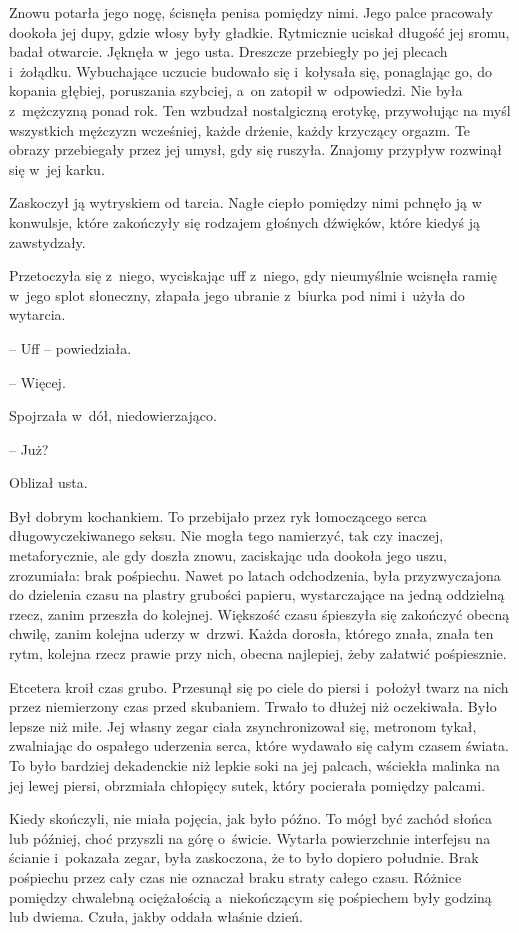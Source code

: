 \documentclass[oneside,polish,11pt,sfheadings]{mwbk}
\begin{document}
Znowu potarła jego nogę, ścisnęła penisa pomiędzy nimi. Jego palce
pracowały dookoła jej dupy, gdzie włosy były gładkie. Rytmicznie uciskał
długość jej sromu, badał otwarcie. Jęknęła w~jego usta. Dreszcze
przebiegły po jej plecach i~żołądku. Wybuchające uczucie budowało się i~kołysała się, ponaglając go, do kopania głębiej, poruszania szybciej, a~on zatopił w~odpowiedzi. Nie była z~mężczyzną ponad rok. Ten wzbudzał
nostalgiczną erotykę, przywołując na myśl wszystkich mężczyzn wcześniej,
każde drżenie, każdy krzyczący orgazm. Te obrazy przebiegały przez jej
umysł, gdy się ruszyła. Znajomy przypływ rozwinął się w~jej karku.

Zaskoczył ją wytryskiem od tarcia. Nagłe ciepło pomiędzy nimi pchnęło ją
w konwulsje, które zakończyły się rodzajem głośnych dźwięków, które
kiedyś ją zawstydzały.

Przetoczyła się z~niego, wyciskając uff z~niego, gdy nieumyślnie
wcisnęła ramię w~jego splot słoneczny, złapała jego ubranie z~biurka pod
nimi i~użyła do wytarcia.

-- Uff -- powiedziała.

-- Więcej.

Spojrzała w~dół, niedowierzająco. 

-- Już?

Oblizał usta.

Był dobrym kochankiem. To przebijało przez ryk łomoczącego serca
długowyczekiwanego seksu. Nie mogła tego namierzyć, tak czy inaczej,
metaforycznie, ale gdy doszła znowu, zaciskając uda dookoła jego uszu,
zrozumiała: brak pośpiechu. Nawet po latach odchodzenia, była
przyzwyczajona do dzielenia czasu na plastry grubości papieru,
wystarczające na jedną oddzielną rzecz, zanim przeszła do kolejnej.
Większość czasu śpieszyła się zakończyć obecną chwilę, zanim kolejna
uderzy w~drzwi. Każda dorosła, którego znała, znała ten rytm, kolejna
rzecz prawie przy nich, obecna najlepiej, żeby załatwić pośpiesznie.

Etcetera kroił czas grubo. Przesunął się po ciele do piersi i~położył
twarz na nich przez niemierzony czas przed skubaniem. Trwało to dłużej
niż oczekiwała. Było lepsze niż miłe. Jej własny zegar ciała
zsynchronizował się, metronom tykał, zwalniając do ospałego uderzenia
serca, które wydawało się całym czasem świata. To było bardziej
dekadenckie niż lepkie soki na jej palcach, wściekła malinka na jej
lewej piersi, obrzmiała chłopięcy sutek, który pocierała pomiędzy
palcami.

Kiedy skończyli, nie miała pojęcia, jak było późno. To mógł być zachód
słońca lub później, choć przyszli na górę o~świcie. Wytarła powierzchnie
interfejsu na ścianie i~pokazała zegar, była zaskoczona, że to było
dopiero południe. Brak pośpiechu przez cały czas nie oznaczał braku
straty całego czasu. Różnice pomiędzy chwalebną ociężałością a~niekończącym się pośpiechem były godziną lub dwiema. Czuła, jakby oddała
właśnie dzień.
\end{document}
